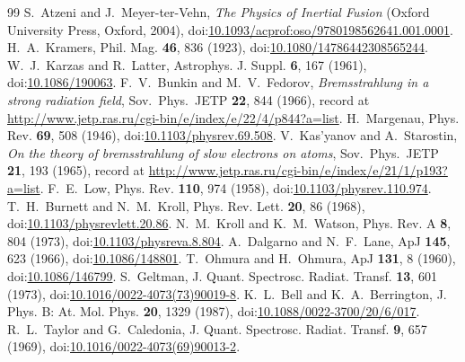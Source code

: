 \documentclass[11pt]{article}
\numberwithin{equation}{section}
\begin{document}
\raggedright
\begin{thebibliography}{99}
 S.~Atzeni and J.~Meyer-ter-Vehn, \emph{The Physics of Inertial Fusion}
(Oxford University Press, Oxford, 2004), doi:\href{https://doi.org/10.1093/acprof:oso/9780198562641.001.0001}{10.1093/acprof:oso/9780198562641.001.0001}.
 H.~A.~Kramers, Phil. Mag. \textbf{46}, 836 (1923), doi:\href{https://doi.org/10.1080/14786442308565244}{10.1080/14786442308565244}.
 W.~J.~Karzas and R.~Latter, Astrophys. J. Suppl. \textbf{6}, 167 (1961), doi:\href{https://doi.org/10.1086/190063}{10.1086/190063}.
 F.~V.~Bunkin and M.~V.~Fedorov, \emph{Bremsstrahlung in a
strong radiation field}, Sov.\ Phys.\ JETP \textbf{22}, 844 (1966), record at
\url{http://www.jetp.ras.ru/cgi-bin/e/index/e/22/4/p844?a=list}.
 H.~Margenau, Phys. Rev. \textbf{69}, 508 (1946), doi:\href{https://doi.org/10.1103/physrev.69.508}{10.1103/physrev.69.508}.
 V.~Kas'yanov and A.~Starostin, \emph{On the
theory of bremsstrahlung of slow electrons on atoms}, Sov.\ Phys.\ JETP
\textbf{21}, 193 (1965), record at
\url{http://www.jetp.ras.ru/cgi-bin/e/index/e/21/1/p193?a=list}.
 F.~E.~Low, Phys. Rev. \textbf{110}, 974 (1958), doi:\href{https://doi.org/10.1103/physrev.110.974}{10.1103/physrev.110.974}.
 T.~H.~Burnett and N.~M.~Kroll, Phys. Rev. Lett. \textbf{20}, 86 (1968), doi:\href{https://doi.org/10.1103/physrevlett.20.86}{10.1103/physrevlett.20.86}.
 N.~M.~Kroll and K.~M.~Watson, Phys. Rev. A \textbf{8}, 804 (1973), doi:\href{https://doi.org/10.1103/physreva.8.804}{10.1103/physreva.8.804}.
 A.~Dalgarno and N.~F.~Lane, ApJ \textbf{145}, 623 (1966), doi:\href{https://doi.org/10.1086/148801}{10.1086/148801}.
 T.~Ohmura and H.~Ohmura, ApJ \textbf{131}, 8 (1960), doi:\href{https://doi.org/10.1086/146799}{10.1086/146799}.
 S.~Geltman, J. Quant. Spectrosc. Radiat. Transf. \textbf{13}, 601 (1973), doi:\href{https://doi.org/10.1016/0022-4073(73)90019-8}{10.1016/0022-4073(73)90019-8}.
 K.~L.~Bell and K.~A.~Berrington, J. Phys. B: At. Mol. Phys. \textbf{20}, 1329 (1987), doi:\href{https://doi.org/10.1088/0022-3700/20/6/017}{10.1088/0022-3700/20/6/017}.
 R.~L.~Taylor and G.~Caledonia, J. Quant. Spectrosc. Radiat. Transf. \textbf{9}, 657 (1969), doi:\href{https://doi.org/10.1016/0022-4073(69)90013-2}{10.1016/0022-4073(69)90013-2}.

\end{thebibliography}
\end{document}
